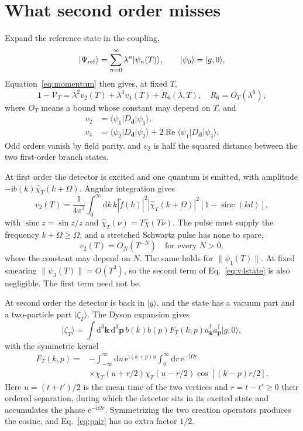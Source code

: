 \documentclass[11pt,a4paper]{article}
\newcommand{\dd}{\mathrm{d}}
\newcommand{\ii}{\mathrm{i}}
\newcommand{\ee}{\mathrm{e}}
\newcommand{\ket}[1]{\lvert #1\rangle}
\newcommand{\bra}[1]{\langle #1\rvert}
\newcommand{\sinc}{\operatorname{sinc}}
\newcommand{\cV}{\mathcal{V}}
\begin{document}
\section{What second order misses}
\label{sec:second}

Expand the reference state in the coupling,
\begin{equation}
 \ket{\Psi_{\rm ref}}=\sum_{n=0}^{\infty}\lambda^n\ket{\psi_n(T)},
 \qquad \ket{\psi_0}=\ket{g,0}.
\end{equation}
Equation~\eqref{eq:momentum} then gives, at fixed $T$,
\begin{equation}
 1-\cV_T=\lambda^2v_2(T)+\lambda^4v_4(T)+R_6(\lambda,T),
 \quad R_6=O_T(\lambda^6),\label{eq:series}
\end{equation}
where $O_T$ means a bound whose constant may depend on $T$, and
\begin{align}
 v_2&=\bra{\psi_1}D_{\bm d}\ket{\psi_1},\label{eq:v2state}\\
 v_4&=\bra{\psi_2}D_{\bm d}\ket{\psi_2}
       +2\operatorname{Re}\bra{\psi_1}D_{\bm d}\ket{\psi_3}.\label{eq:v4state}
\end{align}
Odd orders vanish by field parity, and $v_2$ is half the squared distance between the two first-order branch states.

At first order the detector is excited and one quantum is emitted, with amplitude $-\ii b(k)\widehat\chi_T(k+\Omega)$. Angular integration gives
\begin{equation}
 v_2(T)=\frac{1}{4\pi^2}\int_0^{\infty}\dd k\,k|\widetilde f(k)|^2
 |\widehat\chi_T(k+\Omega)|^2[1-\sinc(kd)],\label{eq:v2}
\end{equation}
with $\sinc z=\sin z/z$ and $\widehat\chi_T(\nu)=T\widehat\chi(T\nu)$. The pulse must supply the frequency $k+\Omega\ge\Omega$, and a stretched Schwartz pulse has none to spare,
\begin{equation}
 v_2(T)=O_N(T^{-N})\quad\text{for every }N>0,\label{eq:super}
\end{equation}
where the constant may depend on $N$. The same holds for $\|\psi_1(T)\|$. At fixed smearing $\|\psi_3(T)\|=O(T^3)$, so the second term of Eq.~\eqref{eq:v4state} is also negligible. The first term need not be.

At second order the detector is back in $\ket g$, and the state has a vacuum part and a two-particle part $\ket{\zeta_T}$. The Dyson expansion gives
\begin{equation}
 \ket{\zeta_T}=\int\dd^3\bm k\,\dd^3\bm p\,
 b(k)b(p)F_T(k,p)a_{\bm k}^{\dagger}a_{\bm p}^{\dagger}\ket{g,0},
 \label{eq:pair}
\end{equation}
with the symmetric kernel
\begin{align}
 F_T(k,p)={}&-\int_{-\infty}^{\infty}\dd u\,\ee^{\ii(k+p)u}
 \int_0^{\infty}\dd r\,\ee^{-\ii\Omega r}\nonumber\\
 &\times\chi_T(u+r/2)\chi_T(u-r/2)
 \cos[(k-p)r/2].\label{eq:F}
\end{align}
Here $u=(t+t')/2$ is the mean time of the two vertices and $r=t-t'\ge0$ their ordered separation, during which the detector sits in its excited state and accumulates the phase $\ee^{-\ii\Omega r}$. Symmetrizing the two creation operators produces the cosine, and Eq.~\eqref{eq:pair} has no extra factor $1/2$.
\end{document}
